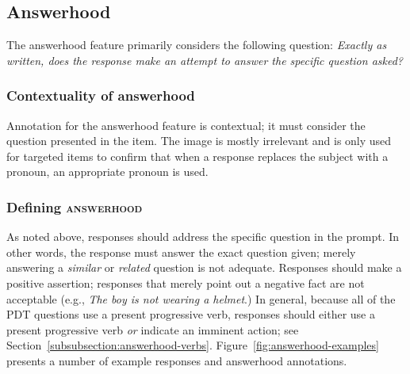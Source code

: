\documentclass[12pt]{article}
\newcommand{\feat}[1]{\textsc{#1}}
\begin{document}
\subsection{Answerhood} \label{subsec:answerhood}

The answerhood feature primarily considers the following question: \textit{Exactly as written, does the response make an attempt to answer the specific question asked?}

\subsubsection{Contextuality of answerhood} Annotation for the answerhood feature is contextual; it must consider the question presented in the item. The image is mostly irrelevant and is only used for targeted items to confirm that when a response replaces the subject with a pronoun, an appropriate pronoun is used.

\subsubsection{Defining \feat{answerhood}} As noted above, responses should address the specific question in the prompt. In other words, the response must answer the exact question given; merely answering a \textit{similar} or \textit{related} question is not adequate. Responses should make a positive assertion; responses that merely point out a negative fact are not acceptable (e.g., \textit{The boy is not wearing a helmet}.) In general, because all of the PDT questions use a present progressive verb, responses should either use a present progressive verb \textit{or} indicate an imminent action; see Section~\ref{subsubsection:answerhood-verbs}. Figure~\ref{fig:answerhood-examples} presents a number of example responses and answerhood annotations. 
\end{document}
